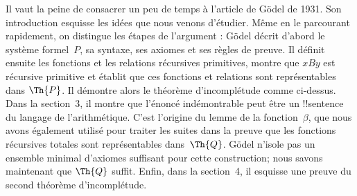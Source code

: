 \documentclass[../../../include/open-logic-section]{subfiles}
\begin{document}


Il vaut la peine de consacrer un peu de temps à
l'article de Gödel de 1931. Son introduction esquisse
les idées que nous venons d'étudier. Même en le
parcourant rapidement, on distingue les étapes de
l'argument : Gödel décrit d'abord le système
formel~$P$, sa syntaxe, ses axiomes et ses règles
de preuve. Il définit ensuite les fonctions et les
relations récursives primitives, montre que
$x B y$ est récursive primitive et établit que ces
fonctions et relations sont représentables dans
$\Th{P}$. Il démontre alors le théorème
d'incomplétude comme ci-dessus. Dans la section~3,
il montre que l'énoncé indémontrable peut être un
!!{sentence} du langage de l'arithmétique. C'est
l'origine du lemme de la fonction~$\beta$, que
nous avons également utilisé pour traiter les
suites dans la preuve que les fonctions récursives totales
sont représentables dans~$\Th{Q}$. Gödel n'isole
pas un ensemble minimal d'axiomes suffisant pour
cette construction; nous savons maintenant que
$\Th{Q}$ suffit. Enfin, dans la section~4,
il esquisse une preuve du second théorème
d'incomplétude.
\end{document}
